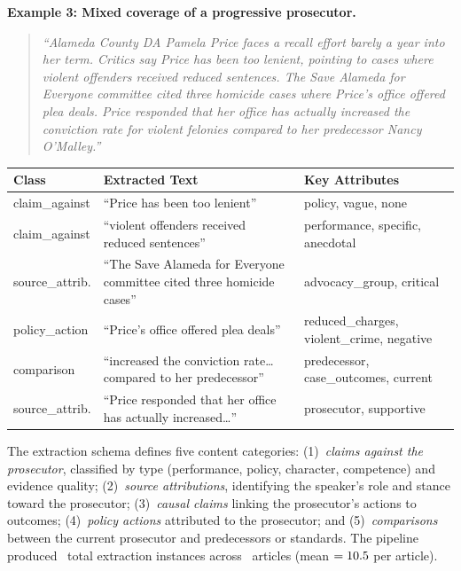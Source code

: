 \documentclass[12pt, letterpaper]{article}
\begin{document}
\begin{appendices}
\noindent\textbf{Example 3: Mixed coverage of a progressive prosecutor.}
\begin{quote}\small
\emph{``Alameda County DA Pamela Price faces a recall effort barely a year into her term. Critics say Price has been too lenient, pointing to cases where violent offenders received reduced sentences. The Save Alameda for Everyone committee cited three homicide cases where Price's office offered plea deals. Price responded that her office has actually increased the conviction rate for violent felonies compared to her predecessor Nancy O'Malley.''}
\end{quote}

\begin{table}[H]
\centering\small
\begin{tabular}{p{2.8cm}p{6.5cm}p{4.5cm}}
\toprule
Class & Extracted Text & Key Attributes \\
\midrule
claim\_against & ``Price has been too lenient'' & policy, vague, none \\
claim\_against & ``violent offenders received reduced sentences'' & performance, specific, anecdotal \\
source\_attrib. & ``The Save Alameda for Everyone committee cited three homicide cases'' & advocacy\_group, critical \\
policy\_action & ``Price's office offered plea deals'' & reduced\_charges, violent\_crime, negative \\
comparison & ``increased the conviction rate\ldots compared to her predecessor'' & predecessor, case\_outcomes, current \\
source\_attrib. & ``Price responded that her office has actually increased\ldots'' & prosecutor, supportive \\
\bottomrule
\end{tabular}
\end{table}

The extraction schema defines five content categories: (1)~\emph{claims against the prosecutor}, classified by type (performance, policy, character, competence) and evidence quality; (2)~\emph{source attributions}, identifying the speaker's role and stance toward the prosecutor; (3)~\emph{causal claims} linking the prosecutor's actions to outcomes; (4)~\emph{policy actions} attributed to the prosecutor; and (5)~\emph{comparisons} between the current prosecutor and predecessors or standards. The pipeline produced \NExtractionsTotal\ total extraction instances across \NAttributedTotal\ articles (mean $= 10.5$ per article).


\end{appendices}
\end{document}
